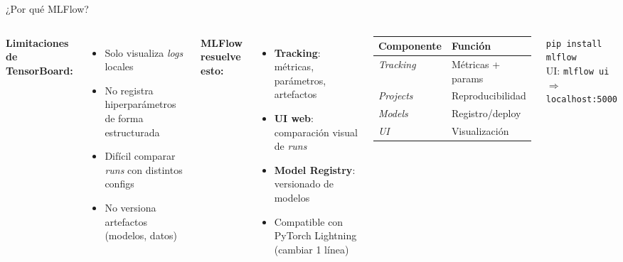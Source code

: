 \documentclass[aspectratio=169,10pt]{beamer}
\begin{document}
\begin{frame}{¿Por qué MLFlow?}
    \begin{columns}
        \textbf{Limitaciones de TensorBoard:}
        \begin{itemize}
            \item Solo visualiza \textit{logs} locales
            \item No registra hiperparámetros de forma estructurada
            \item Difícil comparar \textit{runs} con distintos configs
            \item No versiona artefactos (modelos, datos)
        \end{itemize}

        \vspace{8pt}
        \textbf{MLFlow resuelve esto:}
        \begin{itemize}
            \item \textbf{Tracking}: métricas, parámetros, artefactos
            \item \textbf{UI web}: comparación visual de \textit{runs}
            \item \textbf{Model Registry}: versionado de modelos
            \item Compatible con PyTorch Lightning (cambiar 1 línea)
        \end{itemize}

        \begin{tcolorbox}[colback=lightgray, colframe=pyblue!60, title=\scriptsize Componentes de MLFlow]
            \scriptsize
            \begin{tabular}{ll}
                \toprule
                Componente & Función \\
                \midrule
                \textit{Tracking}  & Métricas + params \\
                \textit{Projects}  & Reproducibilidad \\
                \textit{Models}    & Registro/deploy \\
                \textit{UI}        & Visualización \\
                \bottomrule
            \end{tabular}
        \end{tcolorbox}

        \vspace{6pt}
        \begin{tcolorbox}[colback=darkgreen!10, colframe=darkgreen]
            \scriptsize
            \texttt{pip install mlflow}\\[4pt]
            UI: \texttt{mlflow ui}\\
            $\Rightarrow$ \texttt{localhost:5000}
        \end{tcolorbox}
    \end{columns}
\end{frame}
\end{document}
